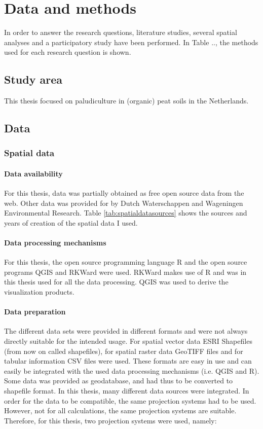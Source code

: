\documentclass[a4paper,12pt]{scrbook}
\begin{document}
\chapter{Data and methods}

In order to answer the research questions, literature studies, several spatial analyses and a participatory study have been performed. In Table .., the methods used for each research question is shown. 

\section{Study area}

This thesis focused on paludiculture in (organic) peat soils in the Netherlands. 

\section{Data}
\subsection{Spatial data}
\subsubsection{Data availability}
For this thesis, data was partially obtained as free open source data from the web. Other data was provided for by Dutch Waterschappen and Wageningen Environmental Research. Table \ref{tab:spatialdatasources} shows the sources and years of creation of the spatial data I used. 

\subsubsection{Data processing mechanisms}
For this thesis, the open source programming language R and the open source programs \ac{QGIS} and RKWard were used. RKWard makes use of R and was in this thesis used for all the data processing. \ac{QGIS} was used to derive the visualization products.

\subsubsection{Data preparation}
The different data sets were provided in different formats and were not always directly suitable for the intended usage. For spatial vector data ESRI Shapefiles (from now on called shapefiles), for spatial raster data \ac{GeoTIFF} files and for tabular information \ac{CSV} files were used. These formats are easy in use and can easily be integrated with the used data processing mechanisms (i.e. \ac{QGIS} and R). Some data was provided as geodatabase, and had thus to be converted to shapefile format. In this thesis, many different data sources were integrated. In order for the data to be compatible, the same projection systems had to be used. However, not for all calculations, the same projection systems are suitable. Therefore, for this thesis, two projection systems were used, namely:
\end{document}
